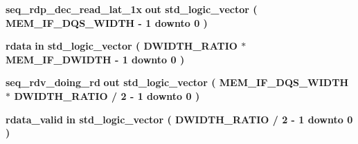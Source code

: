 \begin{DoxyCompactItemize}
\item 
{\bf seq\+\_\+rdp\+\_\+dec\+\_\+read\+\_\+lat\+\_\+1x}  {\bfseries {\bfseries \textcolor{keywordflow}{out}\textcolor{vhdlchar}{ }}} {\bfseries \textcolor{comment}{std\+\_\+logic\+\_\+vector}\textcolor{vhdlchar}{ }\textcolor{vhdlchar}{(}\textcolor{vhdlchar}{ }\textcolor{vhdlchar}{ }\textcolor{vhdlchar}{ }\textcolor{vhdlchar}{ }{\bfseries {\bf M\+E\+M\+\_\+\+I\+F\+\_\+\+D\+Q\+S\+\_\+\+W\+I\+D\+TH}} \textcolor{vhdlchar}{-\/}\textcolor{vhdlchar}{ } \textcolor{vhdldigit}{1} \textcolor{vhdlchar}{ }\textcolor{keywordflow}{downto}\textcolor{vhdlchar}{ }\textcolor{vhdlchar}{ } \textcolor{vhdldigit}{0} \textcolor{vhdlchar}{ }\textcolor{vhdlchar}{)}\textcolor{vhdlchar}{ }} 
\item 
{\bf rdata}  {\bfseries {\bfseries \textcolor{keywordflow}{in}\textcolor{vhdlchar}{ }}} {\bfseries \textcolor{comment}{std\+\_\+logic\+\_\+vector}\textcolor{vhdlchar}{ }\textcolor{vhdlchar}{(}\textcolor{vhdlchar}{ }\textcolor{vhdlchar}{ }\textcolor{vhdlchar}{ }\textcolor{vhdlchar}{ }{\bfseries {\bf D\+W\+I\+D\+T\+H\+\_\+\+R\+A\+T\+IO}} \textcolor{vhdlchar}{$\ast$}\textcolor{vhdlchar}{ }\textcolor{vhdlchar}{ }\textcolor{vhdlchar}{ }{\bfseries {\bf M\+E\+M\+\_\+\+I\+F\+\_\+\+D\+W\+I\+D\+TH}} \textcolor{vhdlchar}{-\/}\textcolor{vhdlchar}{ } \textcolor{vhdldigit}{1} \textcolor{vhdlchar}{ }\textcolor{keywordflow}{downto}\textcolor{vhdlchar}{ }\textcolor{vhdlchar}{ } \textcolor{vhdldigit}{0} \textcolor{vhdlchar}{ }\textcolor{vhdlchar}{)}\textcolor{vhdlchar}{ }} 
\item 
{\bf seq\+\_\+rdv\+\_\+doing\+\_\+rd}  {\bfseries {\bfseries \textcolor{keywordflow}{out}\textcolor{vhdlchar}{ }}} {\bfseries \textcolor{comment}{std\+\_\+logic\+\_\+vector}\textcolor{vhdlchar}{ }\textcolor{vhdlchar}{(}\textcolor{vhdlchar}{ }\textcolor{vhdlchar}{ }\textcolor{vhdlchar}{ }\textcolor{vhdlchar}{ }{\bfseries {\bf M\+E\+M\+\_\+\+I\+F\+\_\+\+D\+Q\+S\+\_\+\+W\+I\+D\+TH}} \textcolor{vhdlchar}{$\ast$}\textcolor{vhdlchar}{ }\textcolor{vhdlchar}{ }\textcolor{vhdlchar}{ }{\bfseries {\bf D\+W\+I\+D\+T\+H\+\_\+\+R\+A\+T\+IO}} \textcolor{vhdlchar}{/}\textcolor{vhdlchar}{ } \textcolor{vhdldigit}{2} \textcolor{vhdlchar}{-\/}\textcolor{vhdlchar}{ } \textcolor{vhdldigit}{1} \textcolor{vhdlchar}{ }\textcolor{keywordflow}{downto}\textcolor{vhdlchar}{ }\textcolor{vhdlchar}{ } \textcolor{vhdldigit}{0} \textcolor{vhdlchar}{ }\textcolor{vhdlchar}{)}\textcolor{vhdlchar}{ }} 
\item 
{\bf rdata\+\_\+valid}  {\bfseries {\bfseries \textcolor{keywordflow}{in}\textcolor{vhdlchar}{ }}} {\bfseries \textcolor{comment}{std\+\_\+logic\+\_\+vector}\textcolor{vhdlchar}{ }\textcolor{vhdlchar}{(}\textcolor{vhdlchar}{ }\textcolor{vhdlchar}{ }\textcolor{vhdlchar}{ }\textcolor{vhdlchar}{ }{\bfseries {\bf D\+W\+I\+D\+T\+H\+\_\+\+R\+A\+T\+IO}} \textcolor{vhdlchar}{/}\textcolor{vhdlchar}{ } \textcolor{vhdldigit}{2} \textcolor{vhdlchar}{-\/}\textcolor{vhdlchar}{ } \textcolor{vhdldigit}{1} \textcolor{vhdlchar}{ }\textcolor{keywordflow}{downto}\textcolor{vhdlchar}{ }\textcolor{vhdlchar}{ } \textcolor{vhdldigit}{0} \textcolor{vhdlchar}{ }\textcolor{vhdlchar}{)}\textcolor{vhdlchar}{ }} 

\end{DoxyCompactItemize}
